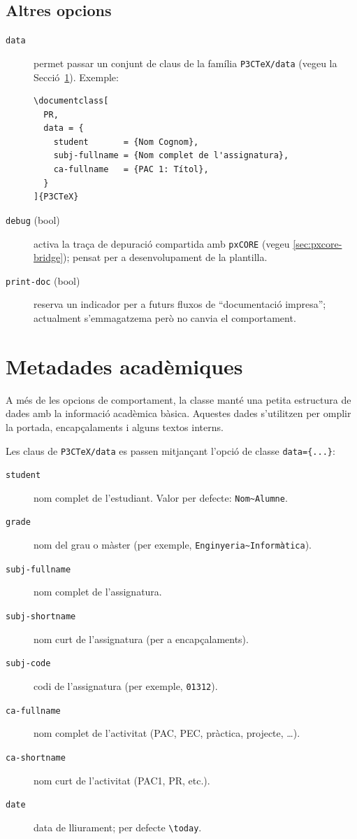 \documentclass[default]{P3CTeX}
\begin{document}
\subsection*{Altres opcions}

\begin{description}
  \item[\texttt{data}] permet passar un conjunt de claus de la família
    \texttt{P3CTeX/data} (vegeu la Secció~\ref{sec:data}). Exemple:
\begin{verbatim}
\documentclass[
  PR,
  data = {
    student       = {Nom Cognom},
    subj-fullname = {Nom complet de l'assignatura},
    ca-fullname   = {PAC 1: Títol},
  }
]{P3CTeX}
\end{verbatim}
  \item[\texttt{debug} (bool)] activa la traça de depuració compartida
    amb \texttt{pxCORE} (vegeu \ref{sec:pxcore-bridge}); pensat per a
    desenvolupament de la plantilla.
  \item[\texttt{print-doc} (bool)] reserva un indicador per a futurs
    fluxos de ``documentació impresa''; actualment s'emmagatzema però
    no canvia el comportament.
\end{description}

\section{Metadades acadèmiques}\label{sec:data}

A més de les opcions de comportament, la classe manté una petita
estructura de dades amb la informació acadèmica bàsica. Aquestes dades
s'utilitzen per omplir la portada, encapçalaments i alguns textos
interns.

Les claus de \verb|P3CTeX/data| es passen mitjançant l'opció de classe
\verb|data={...}|:

\begin{description}
  \item[\texttt{student}] nom complet de l'estudiant.
        Valor per defecte: \texttt{Nom\textasciitilde Alumne}.
  \item[\texttt{grade}] nom del grau o màster
        (per exemple, \texttt{Enginyeria\textasciitilde Informàtica}).
  \item[\texttt{subj-fullname}] nom complet de l'assignatura.
  \item[\texttt{subj-shortname}] nom curt de l'assignatura (per a
        encapçalaments).
  \item[\texttt{subj-code}] codi de l'assignatura (per exemple, \texttt{01312}).
  \item[\texttt{ca-fullname}] nom complet de l'activitat (PAC, PEC,
        pràctica, projecte, \dots).
  \item[\texttt{ca-shortname}] nom curt de l'activitat (PAC1, PR, etc.).
  \item[\texttt{date}] data de lliurament; per defecte \verb|\today|.
\end{description}
\end{document}
